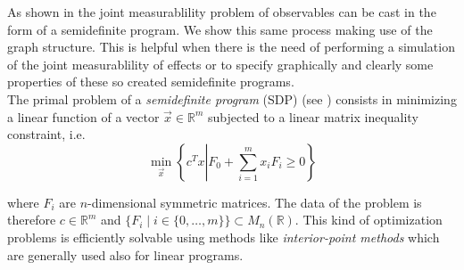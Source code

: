 \documentclass[10pt, a4paper]{amsart}
\begin{document}
As shown in 
\cite{wolfgarcia}
the joint measurablility problem of observables can be cast in the form of a semidefinite program. We show this same process making use of the 
graph structure. This is helpful when there is the need of performing a simulation of the joint measurablility of effects or to specify graphically and 
clearly some properties of these so created semidefinite programs. \\

The primal problem of a \textit{semidefinite program} (SDP) (see \cite{vandenberghe1996semidefinite}) consists in minimizing a linear function of a vector $\vec{x}\in \mathbb{R}^{m}$ subjected to a linear matrix inequality constraint, i.e. 
\begin{equation}\label{eq:SDP:GENERAL_FORMULA:PRIMAL}
\min_{\vec{x}} 
\left \{
c^{T}x
\left| 
F_{0}
+
\sum_{i=1}^{m}
x_{i}F_{i}
\geq 0
\right .
\right \}
\end{equation}

where $F_{i} $ are $n$-dimensional symmetric matrices. The data of the problem is therefore $c\in \mathbb{R}^{m}$ and $\{F_{i}\mid i\in \{0,\ldots, m\}\}\subset M_{n}(\mathbb{R})$. This kind of optimization problems is efficiently solvable using methods like \textit{interior-point methods} which are generally used also for linear programs.\\
\end{document}
